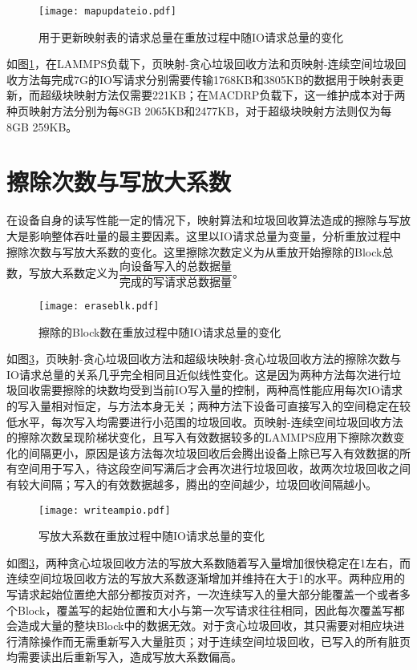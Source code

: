 \begin{figure}[H]
    \centering
    \texttt{[image: mapupdateio.pdf]}
    \caption{用于更新映射表的请求总量在重放过程中随IO请求总量的变化}
    \label{fig:res_mapupdate}
\end{figure}

如图\ref{fig:res_mapupdate}，在LAMMPS负载下，页映射-贪心垃圾回收方法和页映射-连续空间垃圾回收方法每完成7G的IO写请求分别需要传输1768KB和3805KB的数据用于映射表更新，而超级块映射方法仅需要221KB；在MACDRP负载下，这一维护成本对于两种页映射方法分别为每8GB 2065KB和2477KB，对于超级块映射方法则仅为每8GB 259KB。

\section{擦除次数与写放大系数}

在设备自身的读写性能一定的情况下，映射算法和垃圾回收算法造成的擦除与写放大是影响整体吞吐量的最主要因素。这里以IO请求总量为变量，分析重放过程中擦除次数与写放大系数的变化。这里擦除次数定义为从重放开始擦除的Block总数，写放大系数定义为$\dfrac{\text{向设备写入的总数据量}}{\text{完成的写请求总数据量}}$。

\begin{figure}[H]
    \centering
    \texttt{[image: eraseblk.pdf]}
    \caption{擦除的Block数在重放过程中随IO请求总量的变化}
    \label{fig:res_writeamp}
\end{figure}

如图\ref{fig:res_writeamp}，页映射-贪心垃圾回收方法和超级块映射-贪心垃圾回收方法的擦除次数与IO请求总量的关系几乎完全相同且近似线性变化。这是因为两种方法每次进行垃圾回收需要擦除的块数均受到当前IO写入量的控制，两种高性能应用每次IO请求的写入量相对恒定，与方法本身无关；两种方法下设备可直接写入的空间稳定在较低水平，每次写入均需要进行小范围的垃圾回收。页映射-连续空间垃圾回收方法的擦除次数呈现阶梯状变化，且写入有效数据较多的LAMMPS应用下擦除次数变化的间隔更小，原因是该方法每次垃圾回收后会腾出设备上除已写入有效数据的所有空间用于写入，待这段空间写满后才会再次进行垃圾回收，故两次垃圾回收之间有较大间隔；写入的有效数据越多，腾出的空间越少，垃圾回收间隔越小。

\begin{figure}[H]
    \centering
    \texttt{[image: writeampio.pdf]}
    \caption{写放大系数在重放过程中随IO请求总量的变化}
    \label{fig:res_writeamp}
\end{figure}

如图\ref{fig:res_writeamp}，两种贪心垃圾回收方法的写放大系数随着写入量增加很快稳定在1左右，而连续空间垃圾回收方法的写放大系数逐渐增加并维持在大于1的水平。两种应用的写请求起始位置绝大部分都按页对齐，一次连续写入的量大部分能覆盖一个或者多个Block，覆盖写的起始位置和大小与第一次写请求往往相同，因此每次覆盖写都会造成大量的整块Block中的数据无效。对于贪心垃圾回收，其只需要对相应块进行清除操作而无需重新写入大量脏页；对于连续空间垃圾回收，已写入的所有脏页均需要读出后重新写入，造成写放大系数偏高。

